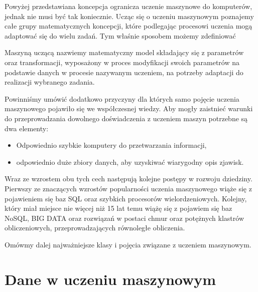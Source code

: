 \documentclass[10pt,a4paper]{book}
\begin{document}
Powyżej przedstawiana koncepcja ogranicza uczenie maszynowe do komputerów, jednak nie musi być tak koniecznie. Ucząc się o uczeniu maszynowym poznajemy całe grupy matematycznych koncepcji, które podlegając procesowi uczenia mogą adaptować się do wielu zadań. Tym właśnie sposobem możemy zdefiniować

\begin{definition}
Maszyną uczącą nazwiemy matematyczny model składający się z parametrów oraz transformacji, wyposażony w proces modyfikacji swoich parametrów na podstawie danych w procesie nazywanym uczeniem, na potrzeby adaptacji do realizacji wybranego zadania.
\end{definition} 

Powinniśmy umówić dodatkowo przyczyny dla których samo pojęcie uczenia maszynowego pojawiło się we współczesnej wiedzy. Aby mogły zaistnieć warunki do przeprowadzania dowolnego doświadczenia z uczeniem maszyn potrzebne są dwa elementy:

\begin{itemize}
\item Odpowiednio szybkie komputery do przetwarzania informacji,
\item odpowiednio duże zbiory danych, aby uzyskiwać wiarygodny opis zjawisk.
\end{itemize}

Wraz ze wzrostem obu tych cech następują kolejne postępy w rozwoju dziedziny. Pierwszy ze znaczących wzrostów popularności uczenia maszynowego wiąże się z pojawieniem się baz SQL oraz szybkich procesorów wielordzeniowych. Kolejny, który miał miejsce nie więcej niż 15 lat temu wiążę się z pojawiem się baz NoSQL, BIG DATA oraz rozwiązań w postaci chmur oraz potężnych klastrów obliczeniowych, przeprowadzających równoległe obliczenia. 

Omówmy dalej najważniejsze klasy i pojęcia związane z uczeniem maszynowym. 

\section{Dane w uczeniu maszynowym}
\end{document}
